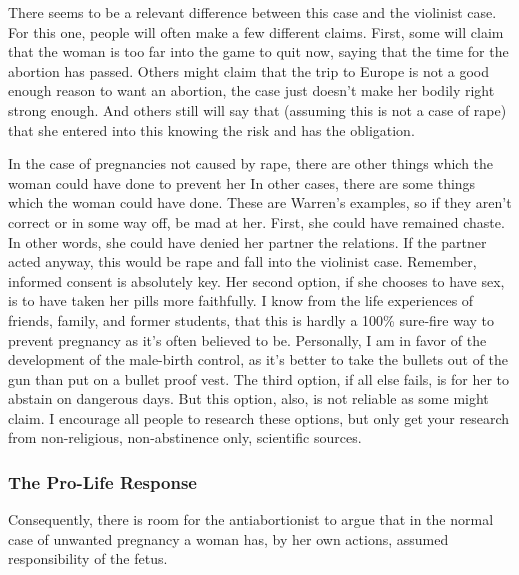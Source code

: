 There seems to be a relevant difference between this case and the violinist case. For this one, people will often make a few different claims. First, some will claim that the woman is too far into the game to quit now, saying that the time for the abortion has passed. Others might claim that the trip to Europe is not a good enough reason to want an abortion, the case just doesn't make her bodily right strong enough. And others still will say that (assuming this is not a case of rape) that she entered into this knowing the risk and has the obligation.

In the case of pregnancies not caused by rape, there are other things which the woman could have done to prevent her In other cases, there are some things which the woman could have done. These are Warren's examples, so if they aren't correct or in some way off, be mad at her.  First, she could have remained chaste. In other words, she could have denied her partner the relations. If the partner acted anyway, this would be rape and fall into the violinist case. Remember, informed consent is absolutely key. Her second option, if she chooses to have sex, is to have taken her pills more faithfully. I know from the life experiences of friends, family, and former students, that this is hardly a 100\% sure-fire way to prevent pregnancy as it's often believed to be.  Personally, I am in favor of the development of the male-birth control, as it's better to take the bullets out of the gun than put on a bullet proof vest. The third option, if all else fails, is for her to abstain on dangerous days. But this option, also, is not reliable as some might claim. I encourage all people to research these options, but only get your research from non-religious, non-abstinence only, scientific sources.  

\subsubsection{The Pro-Life Response}

Consequently, there is room for the antiabortionist to argue that in the normal case of unwanted pregnancy a woman has, by her own actions, assumed responsibility of the fetus.

